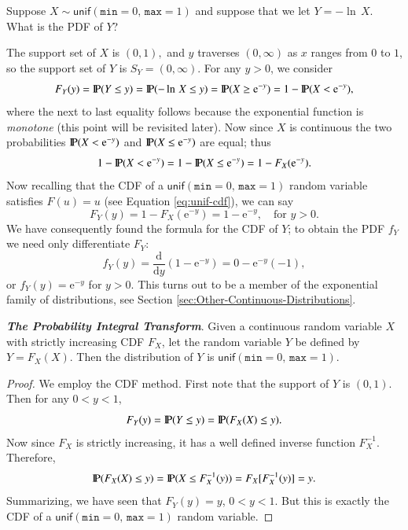\documentclass[captions=tableheading]{scrbook}
\begin{document}
\begin{example}
Suppose \(X\sim\mathsf{unif}(\mathtt{min}=0,\,\mathtt{max}=1)\) and
suppose that we let \(Y=-\ln\, X\). What is the PDF of \(Y\)?

The support set of \(X\) is \((0,1),\) and \(y\) traverses \((0,\infty)\) as \(x\) ranges from \(0\) to \(1\), so the support set of \(Y\) is \(S_{Y}=(0,\infty)\). For any \(y>0\), we consider
\[
F_{Y}(y)=\P(Y\leq y)=\P(-\ln\, X\leq y)=\P(X\geq\mathrm{e}^{-y})=1-\P(X<\mathrm{e}^{-y}),
\]
where the next to last equality follows because the exponential function is \emph{monotone} (this point will be revisited later). Now since \(X\) is continuous the two probabilities \(\P(X<\mathrm{e}^{-y})\) and \(\P(X\leq\mathrm{e}^{-y})\) are equal; thus
\[
1-\P(X < \mathrm{e}^{-y})=1-\P(X\leq\mathrm{e}^{-y})=1-F_{X}(\mathrm{e}^{-y}).
\]
Now recalling that the CDF of a \(\mathsf{unif}(\mathtt{min}=0,\,\mathtt{max}=1)\) random variable satisfies \(F(u)=u\) (see Equation \ref{eq:unif-cdf}), we can say
\[
F_{Y}(y)=1-F_{X}(\mathrm{e}^{-y})=1-\mathrm{e}^{-y},\quad\mbox{for }y>0.
\]
We have consequently found the formula for the CDF of \(Y\); to obtain the PDF \(f_{Y}\) we need only differentiate \(F_{Y}\):
\[
f_{Y}(y)=\frac{\mathrm{d}}{\mathrm{d} y}\left(1-\mathrm{e}^{-y}\right)=0-\mathrm{e}^{-y}(-1),
\]
or \(f_{Y}(y)=\mathrm{e}^{-y}\) for \(y>0\). This turns out to be a member of the exponential family of distributions, see Section \ref{sec:Other-Continuous-Distributions}. 
\end{example}

\begin{example}
\textbf{\emph{The Probability Integral Transform}}. Given a continuous random variable \(X\) with strictly increasing CDF \(F_{X}\), let the random variable \(Y\) be defined by \(Y=F_{X}(X)\). Then the distribution of \(Y\) is \(\mathsf{unif}(\mathtt{min}=0,\,\mathtt{max}=1)\).
\end{example}

\begin{proof}
We employ the CDF method. First note that the support of \(Y\) is \((0,1)\). Then for any \(0<y<1\),
\[
F_{Y}(y)=\P(Y\leq y)=\P(F_{X}(X)\leq y).
\]
Now since \(F_{X}\) is strictly increasing, it has a well defined inverse function \(F_{X}^{-1}\). Therefore,
\[
\P(F_{X}(X)\leq y)=\P(X\leq F_{X}^{-1}(y))=F_{X}[F_{X}^{-1}(y)]=y.
\]
Summarizing, we have seen that \(F_{Y}(y)=y\), \(0<y<1\). But this is exactly the CDF of a \(\mathsf{unif}(\mathtt{min}=0,\,\mathtt{max}=1)\) random variable. 
\end{proof}
\end{document}
